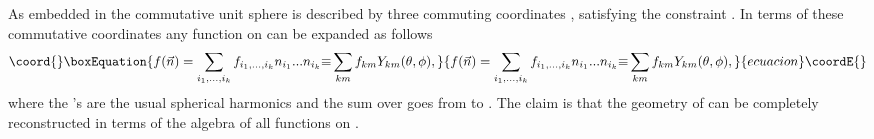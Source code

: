 \documentclass[a4paper,10pt]{article}
\begin{document}
As embedded in \coordHE{} the commutative unit sphere is
described by three commuting coordinates \coordHE{}  , \coordHE{}
satisfying the constraint \coordHE{} . In terms of these
commutative coordinates any function on \coordHE{} can be
expanded as follows
\begin{equation}\coord{}\boxEquation{
{f}(\vec{n})=\sum_{i_1,...,i_k}f_{i_1,...,i_k}n_{i_1}...n_{i_k}{\equiv}\sum_{km}f_{km}Y_{km}(\theta,\phi),
}{
{f}(\vec{n})=\sum_{i_1,...,i_k}f_{i_1,...,i_k}n_{i_1}...n_{i_k}{\equiv}\sum_{km}f_{km}Y_{km}(\theta,\phi),
}{ecuacion}\coordE{}\end{equation}
where the \coordHE{}'s are the usual spherical harmonics and the
sum over \coordHE{} goes from \coordHE{} to \myHighlight{$\infty$}\coordHE{} . The claim is that the
geometry of \coordHE{} can be completely reconstructed in terms
of the algebra \coordHE{} of all functions \coordHE{} on \coordHE{} .
\end{document}
